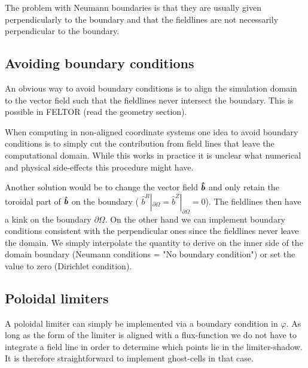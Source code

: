 The problem with Neumann boundaries is that they are usually given 
perpendicularly to the boundary and that the fieldlines are not necessarily
perpendicular to the boundary. 

\subsection{Avoiding boundary conditions}
An obvious way to avoid boundary conditions is to
align the simulation domain to the vector field such that the fieldlines
never intersect the boundary. This is possible in FELTOR (read the
geometry section).

When computing in non-aligned coordinate systems
one idea to avoid boundary conditions 
is to simply cut the contribution from field lines
that leave the computational domain. While this works in practice
it is unclear what numerical and physical side-effects this procedure might have. 

Another solution would be to change the 
vector field $\bm{\hat{b}}$ and only retain the toroidal part of $\bm{\hat{b}}$ on the 
boundary ( $\hat b^R|_{\partial\Omega} = \hat b^Z|_{\partial\Omega} =0$). The fieldlines then have a kink on the boundary $\partial\Omega$. 
On the other hand we can implement boundary conditions consistent with 
the perpendicular ones since the fieldlines never leave the domain. 
We simply interpolate the quantity to derive on the inner side of the
domain boundary (Neumann conditions = "No boundary condition") or 
set the value to zero (Dirichlet condition).

\subsection{Poloidal limiters}
A poloidal limiter can simply be implemented via a boundary condition in $\varphi$. 
As long as the form of the limiter is aligned with a flux-function we do not have to 
integrate a field line in order to determine which points lie in the
limiter-shadow. It is therefore straightforward to implement ghost-cells 
in that case. 


